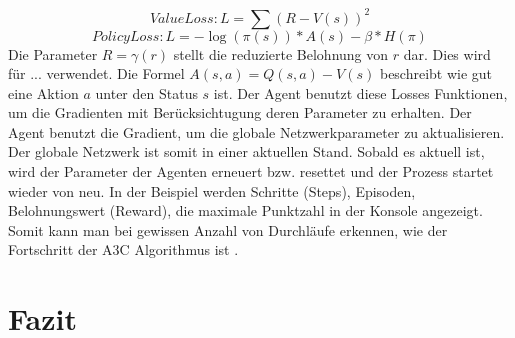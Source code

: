 \documentclass{IEEEtran}
\begin{document}
\[Value Loss: L = \sum{(R - V(s))}^2 \]
\[Policy Loss: L = -\log{(\pi(s))} * A(s) -\beta*H(\pi) \]
Die Parameter $R = \gamma(r)$ stellt die reduzierte Belohnung von $r$ dar. Dies wird für ... verwendet. Die Formel $A(s,a) = Q(s,a) - V(s)$ beschreibt wie gut eine Aktion $a$ unter den Status $s$ ist. 
Der Agent benutzt diese Losses Funktionen, um die Gradienten mit Berücksichtugung deren Parameter zu erhalten. 
Der Agent benutzt die Gradient, um die globale Netzwerkparameter zu aktualisieren. Der globale Netzwerk ist somit in einer aktuellen Stand. 
Sobald es aktuell ist, wird der Parameter der Agenten erneuert bzw. resettet und der Prozess startet wieder von neu. 
In der Beispiel werden Schritte (Steps), Episoden, Belohnungswert (Reward), die maximale Punktzahl in der Konsole angezeigt. Somit kann man bei gewissen Anzahl von Durchläufe erkennen, wie der Fortschritt der A3C Algorithmus ist \cite{A3C3}.
\section{Fazit}

  

\end{document}
